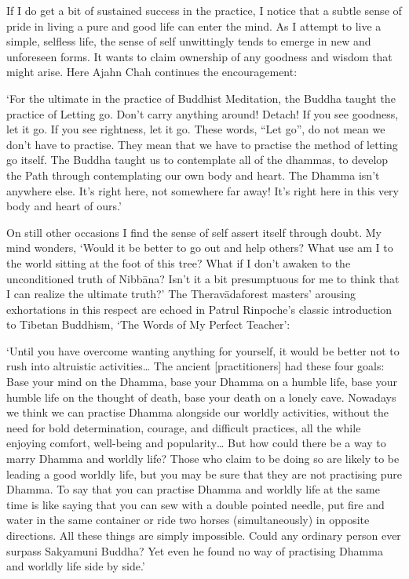 If I do get a bit of sustained success in the practice, I notice that a
subtle sense of pride in living a pure and good life can enter the mind.
As I attempt to live a simple, selfless life, the sense of self
unwittingly tends to emerge in new and unforeseen forms. It wants to
claim ownership of any goodness and wisdom that might arise. Here Ajahn
Chah continues the encouragement:

`For the ultimate in the practice of Buddhist Meditation, the Buddha
taught the practice of Letting go. Don't carry anything around! Detach!
If you see goodness, let it go. If you see rightness, let it go. These
words, ``Let go'', do not mean we don't have to practise. They mean that
we have to practise the method of letting go itself. The Buddha taught
us to contemplate all of the dhammas, to develop the Path through
contemplating our own body and heart. The Dhamma isn't anywhere else.
It's right here, not somewhere far away! It's right here in this very
body and heart of ours.'

On still other occasions I find the sense of self assert itself through
doubt. My mind wonders, `Would it be better to go out and help others?
What use am I to the world sitting at the foot of this tree? What if I
don't awaken to the unconditioned truth of Nibbāna? Isn't it a bit
presumptuous for me to think that I can realize the ultimate truth?' The
Theravāda‎forest masters' arousing exhortations in this respect are
echoed in Patrul Rinpoche's classic introduction to Tibetan Buddhism,
`The Words of My Perfect Teacher':

`Until you have overcome wanting anything for yourself, it would be
better not to rush into altruistic activities\ldots{} The ancient
{[}practitioners{]} had these four goals: Base your mind on the Dhamma,
base your Dhamma on a humble life, base your humble life on the thought
of death, base your death on a lonely cave. Nowadays we think we can
practise Dhamma alongside our worldly activities, without the need for
bold determination, courage, and difficult practices, all the while
enjoying comfort, well-being and popularity\ldots{} But how could there
be a way to marry Dhamma and worldly life? Those who claim to be doing
so are likely to be leading a good worldly life, but you may be sure
that they are not practising pure Dhamma. To say that you can practise
Dhamma and worldly life at the same time is like saying that you can sew
with a double pointed needle, put fire and water in the same container
or ride two horses (simultaneously) in opposite directions. All these
things are simply impossible. Could any ordinary person ever surpass
Sakyamuni Buddha? Yet even he found no way of practising Dhamma and
worldly life side by side.'

